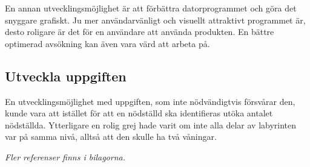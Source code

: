 \documentclass[11pt]{article}
\begin{document}
\begin{flushleft}
En annan utvecklingsmöjlighet är att förbättra datorprogrammet och göra det snyggare grafiskt. Ju mer användarvänligt och visuellt attraktivt programmet är, desto roligare är det för en användare att använda produkten. En bättre optimerad avsökning kan även vara värd att arbeta på.

\subsection{Utveckla uppgiften}
En utvecklingsmöjlighet med uppgiften, som inte nödvändigtvis försvårar den, kunde vara att istället för att en nödställd ska identifieras utöka antalet nödställda. Ytterligare en rolig grej hade varit om inte alla delar av labyrinten var på samma nivå, alltså att den skulle ha två våningar. 

\pagebreak




\textit{Fler referenser finns i bilagorna.}

\pagebreak


\appendix

\end{flushleft}
\end{document}
